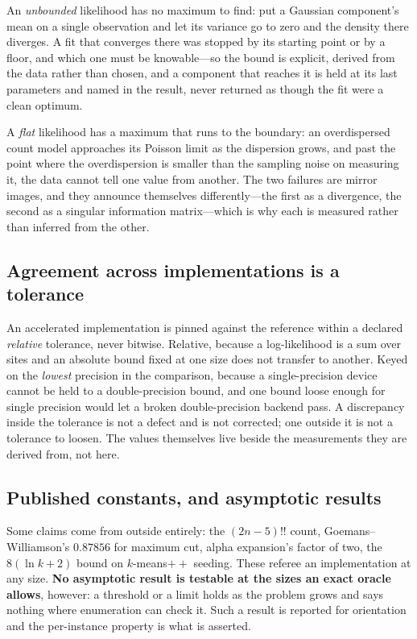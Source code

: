 \documentclass[11pt,a4paper]{article}
\begin{document}
An \emph{unbounded} likelihood has no maximum to find: put a Gaussian
component's mean on a single observation and let its variance go to zero and
the density there diverges. A fit that converges there was stopped by its
starting point or by a floor, and which one must be knowable---so the bound is
explicit, derived from the data rather than chosen, and a component that
reaches it is held at its last parameters and named in the result, never
returned as though the fit were a clean optimum.

A \emph{flat} likelihood has a maximum that runs to the boundary: an
overdispersed count model approaches its Poisson limit as the dispersion grows,
and past the point where the overdispersion is smaller than the sampling noise
on measuring it, the data cannot tell one value from another. The two failures
are mirror images, and they announce themselves differently---the first as a
divergence, the second as a singular information matrix---which is why each is
measured rather than inferred from the other.

\subsection{Agreement across implementations is a tolerance}
\label{sec:tolerance}
An accelerated implementation is pinned against the reference within a
declared \emph{relative} tolerance, never bitwise. Relative, because a
log-likelihood is a sum over sites and an absolute bound fixed at one size does
not transfer to another. Keyed on the \emph{lowest} precision in the
comparison, because a single-precision device cannot be held to a
double-precision bound, and one bound loose enough for single precision would
let a broken double-precision backend pass. A discrepancy inside the tolerance
is not a defect and is not corrected; one outside it is not a tolerance to
loosen. The values themselves live beside the measurements they are derived
from, not here.

\subsection{Published constants, and asymptotic results}
Some claims come from outside entirely: the $(2n-5)!!$ count, Goemans--Williamson's
$0.87856$ for maximum cut, alpha expansion's factor of two, the
$8(\ln k + 2)$ bound on $k$-means$++$ seeding. These referee an implementation
at any size. \textbf{No asymptotic result is testable at the sizes an exact
oracle allows}, however: a threshold or a limit holds as the problem grows and
says nothing where enumeration can check it. Such a result is reported for
orientation and the per-instance property is what is asserted.
\end{document}
